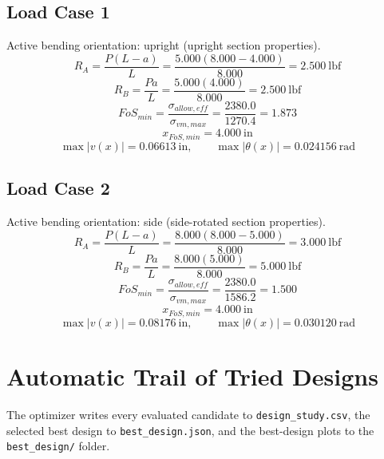 \documentclass[11pt]{article}
\begin{document}
\subsection*{Load Case 1}
Active bending orientation: upright (upright section properties).
\[R_A = \frac{P(L-a)}{L} = \frac{5.000(8.000-4.000)}{8.000} = 2.500\ \mathrm{lbf}\]
\[R_B = \frac{Pa}{L} = \frac{5.000(4.000)}{8.000} = 2.500\ \mathrm{lbf}\]
\[FoS_{min} = \frac{\sigma_{allow,eff}}{\sigma_{vm,max}} = \frac{2380.0}{1270.4} = 1.873\]
\[x_{FoS,min} = 4.000\ \mathrm{in}\]
\[\max |v(x)| = 0.06613\ \mathrm{in}, \qquad \max |\theta(x)| = 0.024156\ \mathrm{rad}\]
\subsection*{Load Case 2}
Active bending orientation: side (side-rotated section properties).
\[R_A = \frac{P(L-a)}{L} = \frac{8.000(8.000-5.000)}{8.000} = 3.000\ \mathrm{lbf}\]
\[R_B = \frac{Pa}{L} = \frac{8.000(5.000)}{8.000} = 5.000\ \mathrm{lbf}\]
\[FoS_{min} = \frac{\sigma_{allow,eff}}{\sigma_{vm,max}} = \frac{2380.0}{1586.2} = 1.500\]
\[x_{FoS,min} = 4.000\ \mathrm{in}\]
\[\max |v(x)| = 0.08176\ \mathrm{in}, \qquad \max |\theta(x)| = 0.030120\ \mathrm{rad}\]

\section*{Automatic Trail of Tried Designs}
The optimizer writes every evaluated candidate to \texttt{design\_study.csv}, the selected best design to \texttt{best\_design.json}, and the best-design plots to the \texttt{best\_design/} folder.
\end{document}
